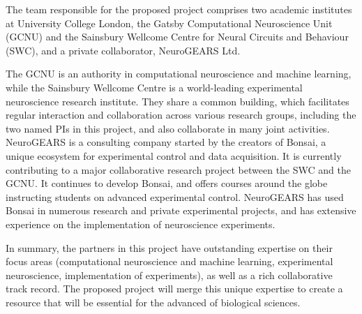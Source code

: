 The team responsible for the proposed project comprises two academic
institutes at University College London, the Gatsby Computational Neuroscience Unit (GCNU) and the Sainsbury
Wellcome Centre for Neural Circuits and Behaviour (SWC), and a private
collaborator, NeuroGEARS Ltd.

The GCNU is an authority in computational neuroscience and
machine learning, while the Sainsbury Wellcome Centre is a world-leading experimental
neuroscience research institute. They share a common building, which facilitates regular interaction and collaboration across various research groups, including the two named PIs in this project, and also collaborate in many joint activities.
%
NeuroGEARS is a consulting company started by the creators of Bonsai, a unique ecosystem
for experimental control and data acquisition. It is currently contributing to a major
collaborative research project between the SWC and the GCNU. It continues to develop Bonsai,
and offers courses around the globe instructing students on advanced experimental control.
NeuroGEARS has used Bonsai in numerous research and private experimental projects,
and has extensive experience on the implementation of neuroscience experiments.

In summary, the partners in this project have outstanding expertise on their focus areas (computational neuroscience and machine learning, experimental
neuroscience, implementation of experiments), as well as a rich collaborative
track record. The proposed project will merge this unique expertise to create a
resource that will be essential for the advanced of biological sciences.
